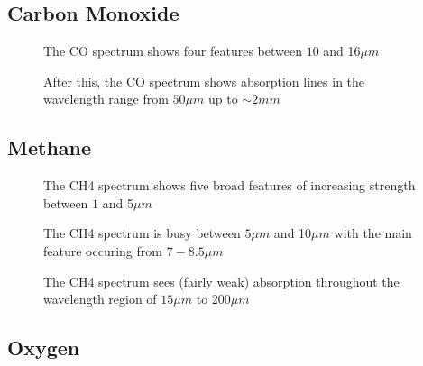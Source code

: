 \documentclass[12pt]{article}
\begin{document}
\subsection{Carbon Monoxide}

\vspace*{13.5cm}
\begin{figure}[htb]
\caption{The CO spectrum shows four features between
  $10$ and  16$\mu m$}
\end{figure}
\newpage

\vspace*{11.5cm}
\begin{figure}[htb]
\caption{After this, the  CO spectrum shows absorption lines in the wavelength range from
 $50 \mu m$ up to $\sim 2mm$}
\end{figure}
\newpage

\subsection{Methane}

\vspace*{13.5cm}
\begin{figure}[htb]
\caption{The CH4 spectrum shows five broad features of increasing strength between
  $1$ and  5$\mu m$}
\end{figure}
\newpage

\vspace*{11.5cm}
\begin{figure}[htb]
\caption{The CH4 spectrum is busy between $5\mu m$ and 10$\mu m$ with the main feature 
occuring from $7-8.5 \mu m$}
\end{figure}
\newpage


\vspace*{11.5cm}
\begin{figure}[htb]
\caption{The CH4 spectrum sees (fairly weak) absorption throughout the
 wavelength region of $15\mu m$ to 200$\mu m$}
\end{figure}
\newpage

\subsection{Oxygen}
\end{document}
